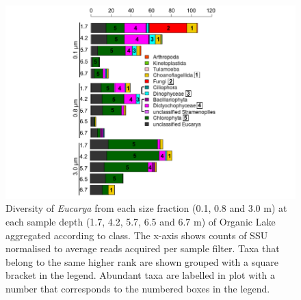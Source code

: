 \begin{centering}
\begin{figure}
\includegraphics[width=\textwidth]{orglake_figures/genus_barplots3_2.pdf}
\caption[Diversity of \emph{Eucarya} in Organic Lake]{Diversity of \emph{Eucarya} from each size fraction (0.1, 0.8 and 3.0 \textmu{}m) at each sample depth (1.7, 4.2, 5.7, 6.5 and 6.7 m) of Organic Lake aggregated according to class. The x-axis shows counts of \ac{SSU} normalised to average reads acquired per sample filter. Taxa that belong to the same higher rank are shown grouped with a square bracket in the legend. Abundant taxa are labelled in plot with a number that corresponds to the numbered boxes in the legend.}
\label{fig:genus_barplots_euk}

\end{figure}
\end{centering}
